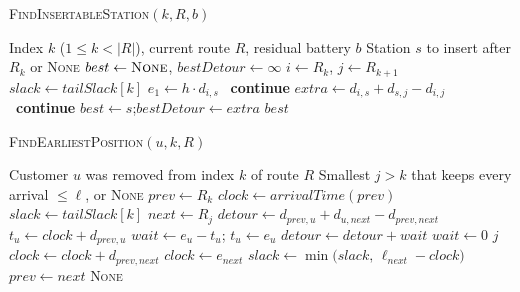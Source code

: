 \documentclass{article}
\begin{document}
\begin{algorithm}[H]
\caption{\textsc{FindInsertableStation}$(k,R,b)$}
\label{alg:findstation}
\begin{algorithmic}[1]
\Require Index $k$ ($1\le k<|R|$), current route $R$, residual battery $b$
\Ensure Station $s$ to insert after $R_k$ or \textsc{None}
    \State $best \gets \textsc{None}$,\; $bestDetour \gets \infty$
    \State $i \gets R_k$, $j \gets R_{k+1}$
    \State $\textit{slack} \gets \textit{tailSlack}[k]$    
                             
        \State $e_1 \gets h\cdot d_{i,s}$                  
        \ \textbf{continue}\EndIf           {}
        \State $extra \gets d_{i,s}+d_{s,j}-d_{i,j}$       
        \ \textbf{continue}\EndIf
            \State $best \gets s$;\quad $bestDetour \gets extra$
        \EndIf
    \EndFor
    \State \Return $best$
\EndFunction
\end{algorithmic}
\end{algorithm}

\begin{algorithm}[H]
\caption{\textsc{FindEarliestPosition}$(u,k,R)$}
\label{alg:findpos}
\begin{algorithmic}[1]
\Require Customer $u$ was removed from index $k$ of route $R$
\Ensure Smallest $j>k$ that keeps every arrival $\le\ell$, or \textsc{None}
    \State $prev \gets R_{k}$                       
    \State $clock \gets \textit{arrivalTime}(prev)$
    \State $slack \gets \textit{tailSlack}[k]$      
               
        \State $next \gets R_{j}$
        \State $detour \gets d_{prev,u}+d_{u,next}-d_{prev,next}$
        \State $t_u \gets clock + d_{prev,u}$       
            \State $wait \gets e_u - t_u$; \quad $t_u \gets e_u$
            \State $detour \gets detour + wait$
        \Else
            \State $wait \gets 0$
        \EndIf
            \State \Return $j$                      
        \EndIf
        \State $clock \gets clock + d_{prev,next}$  
         \State $clock \gets e_{next}$ \EndIf
        \State $slack \gets \min\bigl(slack,\,\ell_{next}-clock\bigr)$
        \State $prev \gets next$
    \EndFor
    \State \Return \textsc{None}                    
\EndFunction
\end{algorithmic}
\end{algorithm}
\end{document}
